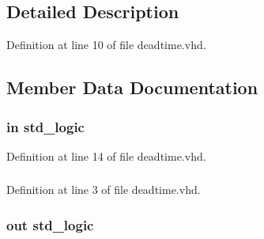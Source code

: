 \subsection{Detailed Description}


Definition at line 10 of file deadtime.\+vhd.



\subsection{Member Data Documentation}
\hypertarget{classdeadtime_ab5d0ea9e968d49d94da9db07a979d402}{}
\subsubsection[{C\+L\+K}]{ {\bfseries \textcolor{keywordflow}{in}\textcolor{vhdlchar}{ }} {\bfseries \textcolor{comment}{std\+\_\+logic}\textcolor{vhdlchar}{ }} \hspace{0.3cm}{\ttfamily [Port]}}\label{classdeadtime_ab5d0ea9e968d49d94da9db07a979d402}


Definition at line 14 of file deadtime.\+vhd.

\hypertarget{classdeadtime_a0a6af6eef40212dbaf130d57ce711256}{}
\subsubsection[{ieee}]{\hspace{0.3cm}{\ttfamily [Library]}}\label{classdeadtime_a0a6af6eef40212dbaf130d57ce711256}


Definition at line 3 of file deadtime.\+vhd.

\hypertarget{classdeadtime_a629edf1594d9c8b1a0844cd27222067a}{}
\subsubsection[{p\+\_\+\+Pwm1\+\_\+\+Out}]{ {\bfseries \textcolor{keywordflow}{out}\textcolor{vhdlchar}{ }} {\bfseries \textcolor{comment}{std\+\_\+logic}\textcolor{vhdlchar}{ }} \hspace{0.3cm}{\ttfamily [Port]}}\label{classdeadtime_a629edf1594d9c8b1a0844cd27222067a}


